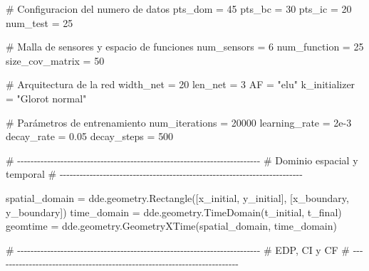 \documentclass[
  spanish,
  us-letterpaper,
]{scrreprt}
\newenvironment{Shaded}{\begin{snugshade}}{\end{snugshade}}
\newcommand{\CommentTok}[1]{\textcolor[rgb]{0.37,0.37,0.37}{#1}}
\newcommand{\DecValTok}[1]{\textcolor[rgb]{0.68,0.00,0.00}{#1}}
\newcommand{\FloatTok}[1]{\textcolor[rgb]{0.68,0.00,0.00}{#1}}
\newcommand{\NormalTok}[1]{\textcolor[rgb]{0.00,0.23,0.31}{#1}}
\newcommand{\OperatorTok}[1]{\textcolor[rgb]{0.37,0.37,0.37}{#1}}
\newcommand{\StringTok}[1]{\textcolor[rgb]{0.13,0.47,0.30}{#1}}
\theoremstyle{definition}
\theoremstyle{plain}
\theoremstyle{remark}
\begin{document}
\begin{Shaded}
\begin{Highlighting}[]
\CommentTok{\# Configuracion del numero de datos}
\NormalTok{pts\_dom }\OperatorTok{=} \DecValTok{45}
\NormalTok{pts\_bc }\OperatorTok{=} \DecValTok{30}
\NormalTok{pts\_ic }\OperatorTok{=} \DecValTok{20}
\NormalTok{num\_test }\OperatorTok{=} \DecValTok{25}

\CommentTok{\# Malla de sensores y espacio de funciones}
\NormalTok{num\_sensors }\OperatorTok{=} \DecValTok{6}
\NormalTok{num\_function }\OperatorTok{=} \DecValTok{25}
\NormalTok{size\_cov\_matrix }\OperatorTok{=} \DecValTok{50}

\CommentTok{\# Arquitectura de la red}
\NormalTok{width\_net }\OperatorTok{=} \DecValTok{20}
\NormalTok{len\_net }\OperatorTok{=} \DecValTok{3}
\NormalTok{AF }\OperatorTok{=} \StringTok{"elu"}
\NormalTok{k\_initializer }\OperatorTok{=} \StringTok{"Glorot normal"}


\CommentTok{\# Parámetros de entrenamiento}
\NormalTok{num\_iterations }\OperatorTok{=} \DecValTok{20000}
\NormalTok{learning\_rate }\OperatorTok{=} \FloatTok{2e{-}3}
\NormalTok{decay\_rate }\OperatorTok{=} \FloatTok{0.05}
\NormalTok{decay\_steps }\OperatorTok{=} \DecValTok{500}

\CommentTok{\# {-}{-}{-}{-}{-}{-}{-}{-}{-}{-}{-}{-}{-}{-}{-}{-}{-}{-}{-}{-}{-}{-}{-}{-}{-}{-}{-}{-}{-}{-}{-}{-}{-}{-}{-}{-}{-}{-}{-}{-}{-}{-}{-}{-}{-}{-}{-}{-}{-}{-}{-}{-}{-}{-}{-}{-}{-}{-}{-}{-}{-}{-}{-}{-}{-}{-}{-}{-}{-}{-}{-}{-}{-}}
\CommentTok{\# Dominio espacial y temporal}
\CommentTok{\# {-}{-}{-}{-}{-}{-}{-}{-}{-}{-}{-}{-}{-}{-}{-}{-}{-}{-}{-}{-}{-}{-}{-}{-}{-}{-}{-}{-}{-}{-}{-}{-}{-}{-}{-}{-}{-}{-}{-}{-}{-}{-}{-}{-}{-}{-}{-}{-}{-}{-}{-}{-}{-}{-}{-}{-}{-}{-}{-}{-}{-}{-}{-}{-}{-}{-}{-}{-}{-}{-}{-}{-}{-}}

\NormalTok{spatial\_domain }\OperatorTok{=}\NormalTok{ dde.geometry.Rectangle([x\_initial, y\_initial],}
\NormalTok{                                        [x\_boundary, y\_boundary])}
\NormalTok{time\_domain }\OperatorTok{=}\NormalTok{ dde.geometry.TimeDomain(t\_initial, t\_final)}
\NormalTok{geomtime }\OperatorTok{=}\NormalTok{ dde.geometry.GeometryXTime(spatial\_domain, time\_domain)}

\CommentTok{\# {-}{-}{-}{-}{-}{-}{-}{-}{-}{-}{-}{-}{-}{-}{-}{-}{-}{-}{-}{-}{-}{-}{-}{-}{-}{-}{-}{-}{-}{-}{-}{-}{-}{-}{-}{-}{-}{-}{-}{-}{-}{-}{-}{-}{-}{-}{-}{-}{-}{-}{-}{-}{-}{-}{-}{-}{-}{-}{-}{-}{-}{-}{-}{-}{-}{-}{-}{-}{-}{-}{-}{-}{-}}
\CommentTok{\# EDP, CI y CF }
\CommentTok{\# {-}{-}{-}{-}{-}{-}{-}{-}{-}{-}{-}{-}{-}{-}{-}{-}{-}{-}{-}{-}{-}{-}{-}{-}{-}{-}{-}{-}{-}{-}{-}{-}{-}{-}{-}{-}{-}{-}{-}{-}{-}{-}{-}{-}{-}{-}{-}{-}{-}{-}{-}{-}{-}{-}{-}{-}{-}{-}{-}{-}{-}{-}{-}{-}{-}{-}{-}{-}{-}{-}{-}{-}{-}}


\end{Highlighting}
\end{Shaded}
\end{document}
